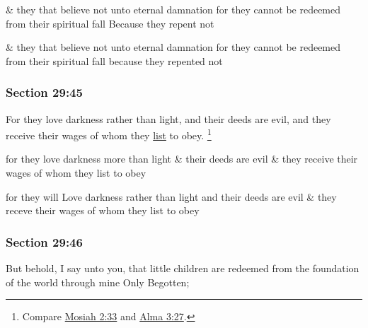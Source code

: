 		\begin{framed}
		\scriptsize
			\begin{compactdesc}
				\item[JSP] \& they that believe not unto eternal damnation for they cannot be redeemed from their spiritual fall Because they repent not
				\item[HSN] \& they that believe not unto eternal damnation for they cannot be redeemed from their spiritual fall because they repented not
			\end{compactdesc}
		\end{framed}

	\subsubsection{Section 29:45} %
		\label{DC29-45}

		For they love darkness rather than light, and their deeds are evil, and they receive their wages of whom they \hyperref[LIST]{list} to obey.%
			\footnote{%
				Compare \hyperref[MOSIAH-2-33]{Mosiah 2:33} and \hyperref[ALMA-3-27]{Alma 3:27}.
				}

		\begin{framed}
		\scriptsize
			\begin{compactdesc}
				\item[JSP] for they love darkness more than light \& their deeds are evil \& they receive their wages of whom they list to obey
				\item[HSN] for they will Love darkness rather than light and their deeds are evil \& they receve their wages of whom they list to obey
			\end{compactdesc}
		\end{framed}

	\subsubsection{Section 29:46} %
		\label{DC29-46}

		But behold, I say unto you, that little children are redeemed from the foundation of the world through mine Only Begotten;

